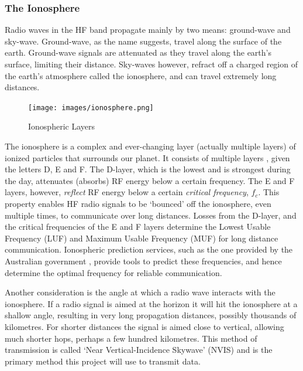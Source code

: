 \documentclass[a4paper,12pt]{article}
\begin{document}
\subsubsection*{The Ionosphere}

Radio waves in the HF band propagate mainly by two means: ground-wave and sky-wave. Ground-wave, as the name suggests, travel along the surface of the earth. Ground-wave signals are attenuated as they travel along the earth's surface, limiting their distance. Sky-waves however, refract off a charged region of the earth's atmosphere called the ionosphere, and can travel extremely long distances.

\begin{figure}[h]
  \begin{center}
    \texttt{[image: images/ionosphere.png]}
  \end{center}
  \caption{Ionospheric Layers}
  \label{fig:ionosphere}
\end{figure}

The ionosphere is a complex and ever-changing layer (actually multiple layers) of ionized particles that surrounds our planet. It consists of multiple layers , given the letters D, E and F. The D-layer, which is the lowest and is strongest during the day, attenuates (absorbs) RF energy below a certain frequency. The E and F layers, however, \textit{reflect} RF energy below a certain \textit{critical frequency}, $f_c$. This property enables HF radio signals to be `bounced' off the ionosphere, even multiple times, to communicate over long distances. Losses from the D-layer, and the critical frequencies of the E and F layers determine the Lowest Usable Frequency (LUF) and Maximum Usable Frequency (MUF) for long distance communication. Ionospheric prediction services, such as the one provided by the Australian government \citep{ref:bom}, provide tools to predict these frequencies, and hence determine the optimal frequency for reliable communication.

Another consideration is the angle at which a radio wave interacts with the ionosphere. If a radio signal is aimed at the horizon it will hit the ionosphere at a shallow angle, resulting in very long propagation distances, possibly thousands of kilometres. For shorter distances the signal is aimed close to vertical, allowing much shorter hops, perhaps a few hundred kilometres. This method of transmission is called `Near Vertical-Incidence Skywave' (NVIS) and is the primary method this project will use to transmit data.
\end{document}
